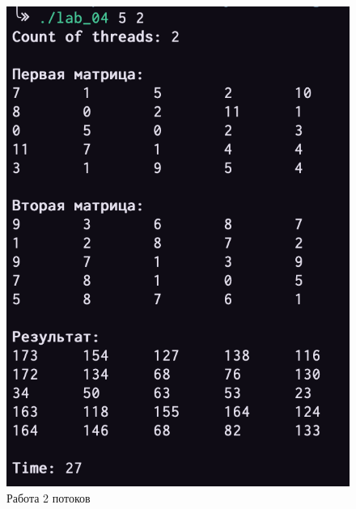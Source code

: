 \documentclass[a4paper,12pt]{article}
\begin{document}
\begin{figure}[H]
    \centering
    \includegraphics[scale=1]{five}
    \caption{Работа 2 потоков}
    \label{img:five}
\end{figure}
\end{document}
